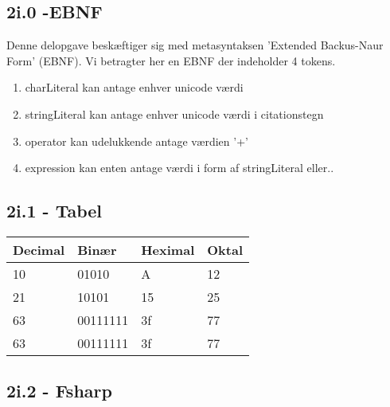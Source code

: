 \subsection*{2i.0 -EBNF}
Denne delopgave beskæftiger sig med metasyntaksen 'Extended Backus-Naur Form' (EBNF). Vi betragter her en EBNF der indeholder 4 tokens. 
\begin{enumerate}
\item{charLiteral kan antage enhver unicode værdi}
\item{stringLiteral kan antage enhver unicode værdi i citationstegn}
\item{operator kan udelukkende antage værdien '+'}
\item{expression kan enten antage værdi i form af stringLiteral eller..}
\end{enumerate}





\subsection*{2i.1 - Tabel}

\begin{center}
    \begin{tabular}{ | l | l | l | l |}
    \hline
    Decimal & Binær & Heximal & Oktal \\ \hline
    10 & 01010 & A & 12 \\ \hline
    21 & 10101 & 15 & 25 \\ \hline
    63 & 00111111 & 3f & 77 \\ \hline
    63 & 00111111 & 3f & 77 \\
    \hline
    \end{tabular}
\end{center}

\subsection*{2i.2 - Fsharp}


